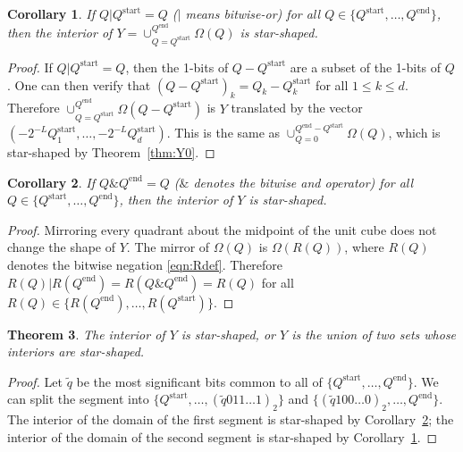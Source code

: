 \documentclass[a4paper,11pt]{article}
\newcommand{\eqnref}[1]{\eqref{eqn:#1}}
\newcommand{\thmref}[1]{Theorem~\ref{thm:#1}}
\newtheorem{thm}{Theorem}
\newtheorem{cor}[thm]{Corollary}
\begin{document}
\begin{cor}
  \label{cor:start}
  If $Q \vert Q^{\text{start}} = Q$ ($\vert$ means bitwise-or) for all
  $Q\in\{Q^{\text{start}},\dots, Q^{\text{end}}\}$, then the interior of
  $Y=\cup_{Q=Q^{\text{start}}}^{Q^{\text{end}}} \Omega(Q)$ is star-shaped.
\end{cor}
\begin{proof}
  If $Q\vert Q^{\text{start}} = Q$, then the 1-bits of $Q-Q^{\text{start}}$
  are a subset of the 1-bits of $Q$.  One can then verify that
  $(Q-Q^{\text{start}})_k = Q_k - Q_k^{\text{start}}$ for all $1\leq k\leq d$.
  Therefore $\cup_{Q=Q^{\text{start}}}^{Q^{\text{end}}}
  \Omega(Q-Q^{\text{start}})$ is $Y$ translated by the vector
  $(-2^{-L}Q_1^{\text{start}},\dots,-2^{-L}Q_d^{\text{start}})$.  This is the
  same as $\cup_{Q=0}^{Q^{\text{end}} - Q^{\text{start}}} \Omega(Q)$,
  which is star-shaped by \thmref{Y0}.
\end{proof}

\begin{cor}
  \label{cor:end}
  If $Q \& Q^{\text{end}} = Q$ ($\&$ denotes the bitwise and operator) for all
  $Q\in\{Q^{\text{start}},\dots, Q^{\text{end}}\}$, then the interior of 
$Y$ is star-shaped.
\end{cor}
\begin{proof}
  Mirroring every quadrant about the midpoint of the unit cube does not change
  the shape of $Y$.  The mirror of $\Omega(Q)$ is $\Omega(R(Q))$, where $R(Q)$
  denotes the bitwise negation \eqnref{Rdef}.
  Therefore $R(Q)\vert R(Q^{\text{end}}) =
  R(Q \& Q^{\text{end}}) = R(Q)$ for all $R(Q) \in \{R(Q^{\text{end}}),\dots,
  R(Q^{\text{start}})\}$.
\end{proof}

\begin{thm}
  \label{thm:uniontwo}
  The interior of
$Y$ is
  star-shaped, or $Y$ is the union of two sets whose interiors are
  star-shaped.
\end{thm}
\begin{proof}
  Let $\tilde{q}$ be the most significant bits common to all of
  $\{Q^{\text{start}},\dots,Q^{\text{end}}\}$.  We can split the segment into
  $\{Q^{\text{start}},\dots,(\tilde{q}011\dots1)_2\}$ and
  $\{(\tilde{q}100\dots0)_2,\dots,Q^{\text{end}}\}$.  The interior of the
  domain of the first segment is star-shaped by Corollary~\ref{cor:end}; the
  interior of the domain of the second segment is star-shaped by
  Corollary~\ref{cor:start}.
\end{proof}
\end{document}
